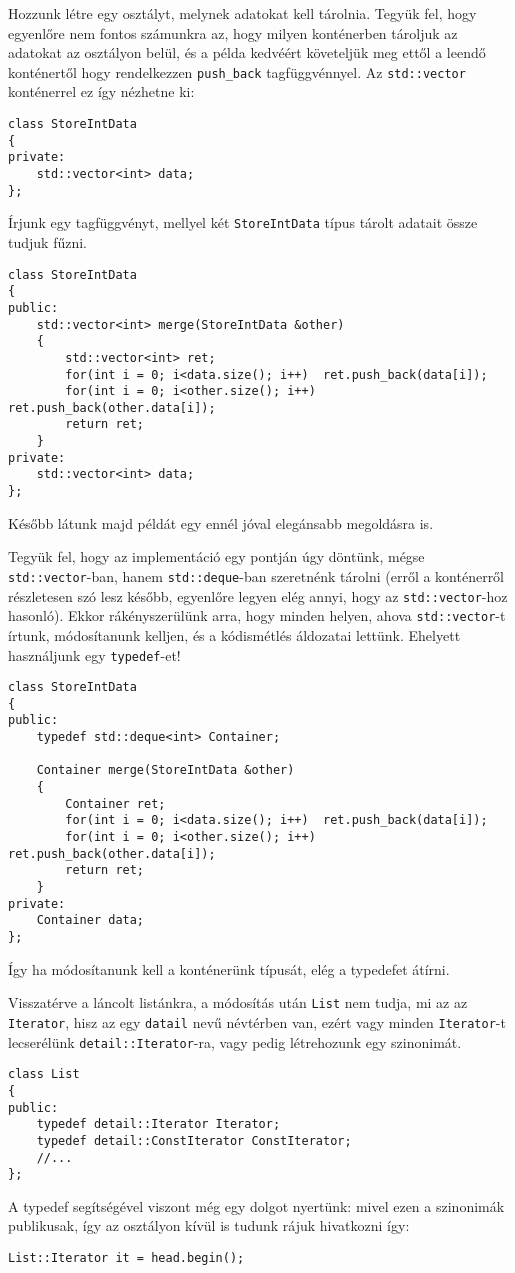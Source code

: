 \documentclass[a4paper,11.5pt,table]{article}
\begin{document}
	\smallskip
	Hozzunk létre egy osztályt, melynek adatokat kell tárolnia. Tegyük fel, hogy egyenlőre nem fontos számunkra az, hogy milyen konténerben tároljuk az adatokat az osztályon belül, és a példa kedvéért követeljük meg ettől a leendő konténertől hogy rendelkezzen \texttt{push\_back} tagfüggvénnyel. Az \texttt{std::vector} konténerrel ez így nézhetne ki:
	\begin{lstlisting}
class StoreIntData
{
private:
	std::vector<int> data;
};
	\end{lstlisting}
	Írjunk egy tagfüggvényt, mellyel két \texttt{StoreIntData} típus tárolt adatait össze tudjuk fűzni.
	\begin{lstlisting}
class StoreIntData
{
public:
	std::vector<int> merge(StoreIntData &other)
	{
		std::vector<int> ret;
		for(int i = 0; i<data.size(); i++)  ret.push_back(data[i]);
		for(int i = 0; i<other.size(); i++) ret.push_back(other.data[i]);
		return ret;
	}
private:
	std::vector<int> data;
};
	\end{lstlisting}
	\begin{note}
		Később látunk majd példát egy ennél jóval elegánsabb megoldásra is.
	\end{note}
	Tegyük fel, hogy az implementáció egy pontján úgy döntünk, mégse \texttt{std::vector}-ban, hanem \texttt{std::deque}-ban szeretnénk tárolni (erről a konténerről részletesen szó lesz később, egyenlőre legyen elég annyi, hogy az \texttt{std::vector}-hoz hasonló). Ekkor rákényszerülünk arra, hogy minden helyen, ahova \texttt{std::vector}-t írtunk, módosítanunk kelljen, és a kódismétlés áldozatai lettünk. Ehelyett használjunk egy \texttt{typedef}-et!
	\begin{lstlisting}
class StoreIntData
{
public:
	typedef std::deque<int> Container;
	
	Container merge(StoreIntData &other)
	{
		Container ret;
		for(int i = 0; i<data.size(); i++)  ret.push_back(data[i]);
		for(int i = 0; i<other.size(); i++) ret.push_back(other.data[i]);
		return ret;
	}
private:
	Container data;
};
	\end{lstlisting}
	Így ha módosítanunk kell a konténerünk típusát, elég a typedefet átírni.
	\medskip
	
	Visszatérve a láncolt listánkra, a módosítás után \texttt{List} nem tudja, mi az az \texttt{Iterator}, hisz az egy \texttt{datail} nevű névtérben van, ezért vagy minden \texttt{Iterator}-t lecserélünk \texttt{detail::Iterator}-ra, vagy pedig létrehozunk egy szinonimát.
	\begin{lstlisting}
class List
{
public:
	typedef detail::Iterator Iterator;
	typedef detail::ConstIterator ConstIterator;
	//...
};
	\end{lstlisting}
	A typedef segítségével viszont még egy dolgot nyertünk: mivel ezen a szinonimák publikusak, így az osztályon kívül is tudunk rájuk hivatkozni így:
	\begin{lstlisting}
List::Iterator it = head.begin();
	\end{lstlisting}
	
	
\end{document}

